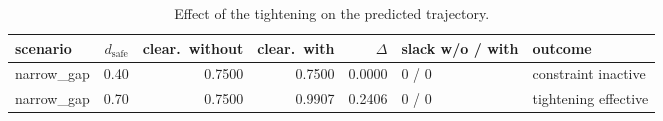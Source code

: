 \begin{table}[htbp]
  \centering
  \small
  \caption{Effect of the tightening on the predicted trajectory.}
  \label{res:tab:robust}
  \begin{tabular}{lrrrrll}
    \toprule
    scenario & $d_{\mathrm{safe}}$ & clear.\ without & clear.\ with & $\Delta$ & slack w/o / with & outcome \\
    \midrule
    narrow\_gap & 0.40 & 0.7500 & 0.7500 & 0.0000 & 0 / 0 & constraint inactive \\
    narrow\_gap & 0.70 & 0.7500 & 0.9907 & 0.2406 & 0 / 0 & tightening effective \\
    \bottomrule
  \end{tabular}
\end{table}

